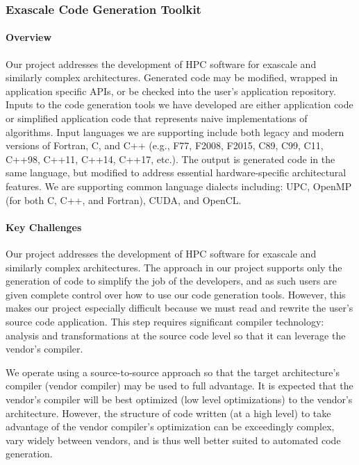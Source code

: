 
\subsubsection{ Exascale Code Generation Toolkit} 


\paragraph{Overview} 

Our project addresses the development of HPC software for exascale and similarly complex architectures. 
Generated code 
may be modified, wrapped in application specific APIs, or be checked into the user’s application 
repository. Inputs to the code generation tools we have developed are either application 
code or simplified application code that represents naive implementations of algorithms. Input languages 
we are supporting include both legacy and modern versions of Fortran, C, and C++ 
(e.g., F77, F2008, F2015, C89, C99, C11, C++98, C++11, C++14, C++17, etc.). The output is generated 
code in the same language, but modified to address essential hardware-specific architectural features. 
We are supporting common language dialects including: UPC, OpenMP 
(for both C, C++, and Fortran), CUDA, and OpenCL.

\paragraph{Key  Challenges}

   Our project addresses the development of HPC software for exascale and
similarly complex architectures.
The approach in our project supports only the generation of code to simplify 
the job of the developers, and as such 
users are given complete control over how to use our code generation tools.
However, this makes our project especially difficult because we must read and rewrite 
the user's source code application.  This step requires significant compiler technology: 
analysis and transformations at the source code level so that it can leverage the vendor's compiler.

We operate using a source-to-source approach so that the target architecture's compiler 
(vendor compiler) may be used to full advantage. It is expected that the vendor's compiler 
will be best optimized (low level optimizations) to the vendor's architecture. However, 
the structure of code written (at a high level) to take advantage of the vendor compiler's 
optimization can be exceedingly complex, vary widely between vendors, and is thus well 
better suited to automated code generation.


